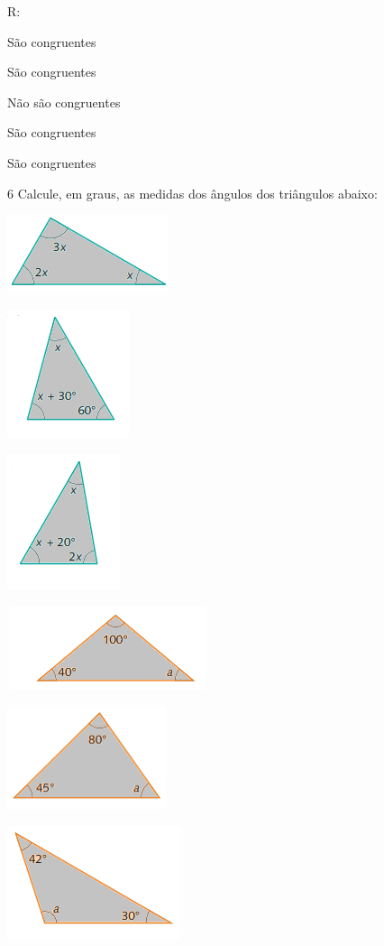 {R:
\item São congruentes
\item São congruentes
\item Não são congruentes
\item São congruentes
\item São congruentes

\num{6} Calcule, em graus, as medidas dos ângulos dos triângulos abaixo:
\item
\includegraphics[width=1.86458in,height=0.89583in]{./imgSAEB_8_MAT/media/image24.png}
\item
\includegraphics[width=1.40625in,height=1.47917in]{./imgSAEB_8_MAT/media/image25.png}
\item
\includegraphics[width=1.30208in,height=1.5625in]{./imgSAEB_8_MAT/media/image26.png}
\item
\includegraphics[width=2.33333in,height=0.95833in]{./imgSAEB_8_MAT/media/image27.png}
\item
\includegraphics[width=1.83333in,height=1.1875in]{./imgSAEB_8_MAT/media/image28.png}
\item
\includegraphics[width=2in,height=1.30208in]{./imgSAEB_8_MAT/media/image29.png}


}
